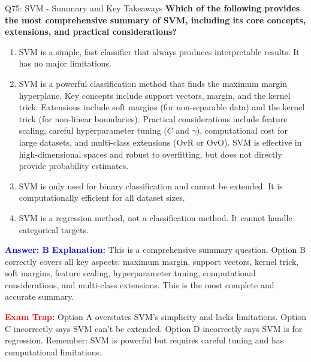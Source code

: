 \documentclass[8pt]{beamer}
\begin{document}
	\begin{frame}{Q75: SVM - Summary and Key Takeaways}
		\fontsize{6.5}{7.5}\selectfont
		\textbf{Which of the following provides the most comprehensive summary of SVM, including its core concepts, extensions, and practical considerations?}
		
		\begin{enumerate}
			\item SVM is a simple, fast classifier that always produces interpretable results. It has no major limitations.
			\item SVM is a powerful classification method that finds the maximum margin hyperplane. Key concepts include support vectors, margin, and the kernel trick. Extensions include soft margins (for non-separable data) and the kernel trick (for non-linear boundaries). Practical considerations include feature scaling, careful hyperparameter tuning ($C$ and $\gamma$), computational cost for large datasets, and multi-class extensions (OvR or OvO). SVM is effective in high-dimensional spaces and robust to overfitting, but does not directly provide probability estimates.
			\item SVM is only used for binary classification and cannot be extended. It is computationally efficient for all dataset sizes.
			\item SVM is a regression method, not a classification method. It cannot handle categorical targets.
		\end{enumerate}
		
		\vspace{0.1cm}
		\textcolor{blue}{\textbf{Answer: B}}
		\vspace{0.1cm}
		\textcolor{blue}{\textbf{Explanation:}} This is a comprehensive summary question. Option B correctly covers all key aspects: maximum margin, support vectors, kernel trick, soft margins, feature scaling, hyperparameter tuning, computational considerations, and multi-class extensions. This is the most complete and accurate summary.
		
		\textcolor{red}{\textbf{Exam Trap:}} Option A overstates SVM's simplicity and lacks limitations. Option C incorrectly says SVM can't be extended. Option D incorrectly says SVM is for regression. Remember: SVM is powerful but requires careful tuning and has computational limitations.
	\end{frame}
	
	
\end{document}
